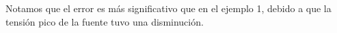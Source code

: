 \documentclass[a4paper]{article} %
\begin{document}
Notamos que el error es más significativo que en el ejemplo 1, debido a que la tensión pico de la fuente tuvo una disminución.

	
	
%	
%	

	
\end{document}
